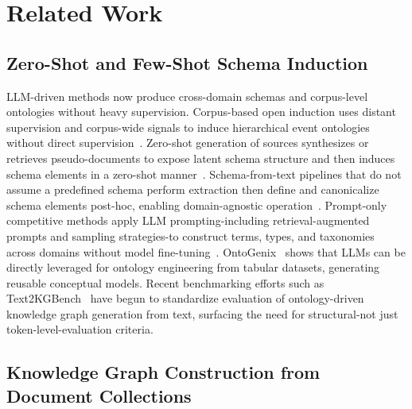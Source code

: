 \documentclass[runningheads,a4paper]{llncs}
\begin{document}
\section{Related Work}
\label{sec:related}

\subsection{Zero-Shot and Few-Shot Schema Induction}

LLM-driven methods now produce cross-domain schemas and corpus-level
ontologies without heavy supervision. Corpus-based open induction uses
distant supervision and corpus-wide signals to induce hierarchical event
ontologies without direct supervision~\cite{zhang2023ceo}. Zero-shot
generation of sources synthesizes or retrieves pseudo-documents to
expose latent schema structure and then induces schema elements in a
zero-shot manner~\cite{giglou2023llms4ol}. Schema-from-text pipelines that
do not assume a predefined schema perform extraction then define and
canonicalize schema elements post-hoc, enabling domain-agnostic
operation~\cite{zhang2024edc}. Prompt-only competitive methods apply LLM
prompting-including retrieval-augmented prompts and sampling
strategies-to construct terms, types, and taxonomies across domains
without model fine-tuning~\cite{beliaeva2025}. OntoGenix~\cite{canobenito2024ontogenix}
shows that LLMs can be directly leveraged for ontology engineering from
tabular datasets, generating reusable conceptual models. Recent
benchmarking efforts such as Text2KGBench~\cite{mihindukulasooriya2023text2kgbench}
have begun to standardize evaluation of ontology-driven knowledge graph
generation from text, surfacing the need for structural-not just
token-level-evaluation criteria.

\subsection{Knowledge Graph Construction from Document Collections}
\end{document}
